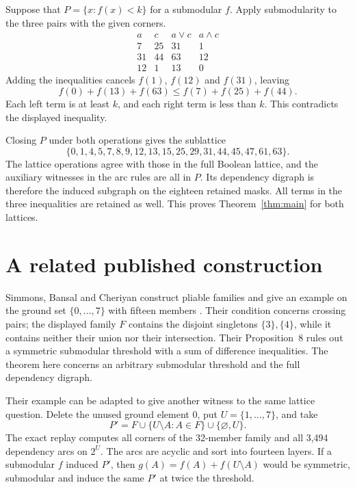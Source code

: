 \documentclass[11pt,a4paper]{amsart}
\begin{document}
Suppose that $P=\{x:f(x)<k\}$ for a submodular $f$. Apply
submodularity to the three pairs with the given corners.
\[
\begin{array}{rr|rr}
 a&c&a\vee c&a\wedge c\\ \hline
 7&25&31&1\\
 31&44&63&12\\
 12&1&13&0
\end{array}
\]
Adding the inequalities cancels $f(1)$, $f(12)$ and $f(31)$, leaving
\[
 f(0)+f(13)+f(63)\leq f(7)+f(25)+f(44).
\]
Each left term is at least $k$, and each right term is less than $k$.
This contradicts the displayed inequality.

Closing $P$ under both operations gives the sublattice
\[
 \{0,1,4,5,7,8,9,12,13,15,25,29,31,44,45,47,61,63\}.
\]
The lattice operations agree with those in the full Boolean lattice,
and the auxiliary witnesses in the arc rules are all in $P$.
Its dependency digraph is therefore the induced subgraph on the
eighteen retained masks. All terms in the three inequalities are
retained as well. This proves Theorem~\ref{thm:main} for both lattices.

\section{A related published construction}

Simmons, Bansal and Cheriyan construct pliable families and give an
example on the ground set $\{0,\ldots,7\}$ with fifteen members
\cite[Example~2]{sbc}. Their condition concerns crossing pairs; the
displayed family $F$ contains the disjoint singletons $\{3\},\{4\}$,
while it contains neither their union nor their intersection.
Their Proposition~8 rules out a symmetric submodular threshold with
a sum of difference inequalities. The theorem here concerns an
arbitrary submodular threshold and the full dependency digraph.

Their example can be adapted to give another witness to the same
lattice question. Delete the unused ground element $0$, put
$U=\{1,\ldots,7\}$, and take
\[
 P'=F\cup\{U\setminus A:A\in F\}\cup\{\varnothing,U\}.
\]
The exact replay computes all corners of the 32-member family and
all 3,494 dependency arcs on $2^U$. The arcs are acyclic and sort
into fourteen layers. If a submodular $f$ induced $P'$, then
$g(A)=f(A)+f(U\setminus A)$ would be symmetric, submodular and induce
the same $P'$ at twice the threshold.
\end{document}
